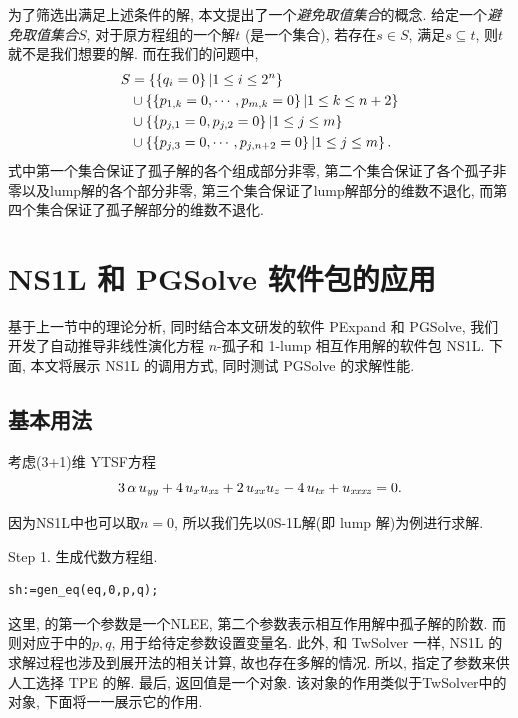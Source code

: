 为了筛选出满足上述条件的解, 本文提出了一个\emph{避免取值集合}的概念. 给定一个\emph{避免取值集合}$S$, 对于原方程组的一个解$t$ (是一个集合), 若存在$s\in S$, 满足$s\subseteq t$, 则$t$就不是我们想要的解. 而在我们的问题中, 
\begin{equation}
\begin{split}
    S&=\left\{\left\{q_i=0\right\}|1\le i \le 2^n\right\} \\ 
     &\cup \left\{\left\{p_{1,k}=0,\cdots,p_{m,k}=0\right\}|1\le k \le n+2\right\}  \\
     &\cup \left\{\left\{p_{j,1}=0,p_{j,2}=0\right\}|1\le j \le m\right\} \\ 
     &\cup \left\{\left\{p_{j,3}=0,\cdots,p_{j,n+2}=0\right\}|1\le j \le m\right\} . 
\end{split}
\end{equation}
式中第一个集合保证了孤子解的各个组成部分非零, 第二个集合保证了各个孤子非零以及lump解的各个部分非零, 第三个集合保证了lump解部分的维数不退化, 而第四个集合保证了孤子解部分的维数不退化.

\section{NS1L 和 PGSolve 软件包的应用}
基于上一节中的理论分析, 同时结合本文研发的软件 PExpand 和 PGSolve, 我们开发了自动推导非线性演化方程 $n$-孤子和 1-lump 相互作用解的软件包 NS1L. 下面, 本文将展示 NS1L 的调用方式, 同时测试 PGSolve 的求解性能.

\subsection{基本用法}
考虑(3+1)维 YTSF方程\CITEcaYTSF 
\begin{equation}
    3\,\alpha\,u_{{{\it yy}}}+4\,u_{{x}}u_{{{\it xz}}}+2\,u_{{{\it xx}}}u_{{z}}-4\,u_{{{\it tx}}}+u_{{{\it xxxz}}}=0. 
\end{equation}

因为NS1L中也可以取$n=0$, 所以我们先以0S-1L解(即 lump 解)为例进行求解. 

Step 1. 生成代数方程组.
\begin{verbatim}
sh:=gen_eq(eq,0,p,q);
\end{verbatim}
这里,  的第一个参数是一个NLEE, 第二个参数表示相互作用解中孤子解的阶数. 而则对应于中的$p,q$, 用于给待定参数设置变量名. 此外, 和 TwSolver 一样, NS1L 的求解过程也涉及到\Painleve{}展开法的相关计算, 故也存在多解的情况. 所以, 指定了参数来供人工选择 TPE 的解. 最后, 返回值是一个对象. 该对象的作用类似于TwSolver中的对象, 下面将一一展示它的作用. 

